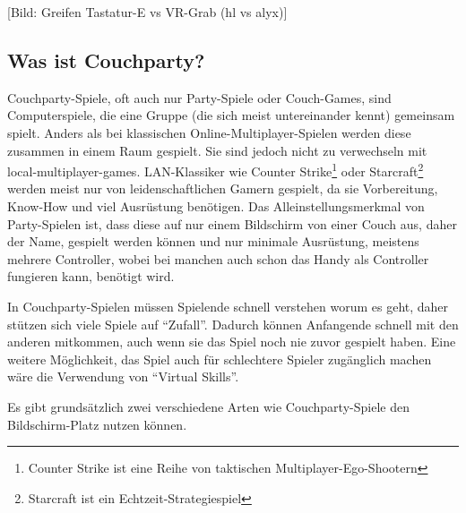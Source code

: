 [Bild: Greifen Tastatur-E vs VR-Grab (hl vs alyx)]

\subsection{Was ist Couchparty?\label{_party_games}}

Couchparty-Spiele, oft auch nur Party-Spiele oder Couch-Games, sind Computerspiele, die eine Gruppe (die sich meist untereinander kennt) gemeinsam spielt. Anders als bei klassischen Online-Multiplayer-Spielen werden diese zusammen in einem Raum gespielt. Sie sind jedoch nicht zu verwechseln mit local-multiplayer-games. LAN-Klassiker wie Counter Strike\footnote{Counter Strike ist eine Reihe von taktischen Multiplayer-Ego-Shootern} oder Starcraft\footnote{Starcraft ist ein Echtzeit-Strategiespiel} werden meist nur von leidenschaftlichen Gamern gespielt, da sie Vorbereitung, Know-How und viel Ausrüstung benötigen. Das Alleinstellungsmerkmal von Party-Spielen ist, dass diese auf nur einem Bildschirm von einer Couch aus, daher der Name, gespielt werden können und nur minimale Ausrüstung, meistens mehrere Controller, wobei bei manchen auch schon das Handy als Controller fungieren kann, benötigt wird.

In Couchparty-Spielen müssen Spielende schnell verstehen worum es geht, daher stützen sich viele Spiele auf "`Zufall"'. Dadurch können Anfangende schnell mit den anderen mitkommen, auch wenn sie das Spiel noch nie zuvor gespielt haben. Eine weitere Möglichkeit, das Spiel auch für schlechtere Spieler zugänglich machen wäre die Verwendung von "`Virtual Skills"'\cite[S. 165]{_art_of_gamedesign}.

Es gibt grundsätzlich zwei verschiedene Arten wie Couchparty-Spiele den Bildschirm-Platz nutzen können.

